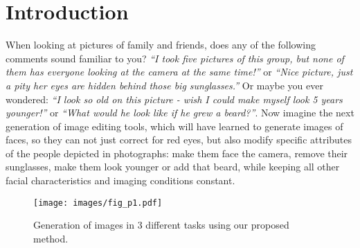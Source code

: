 \documentclass[10pt,twocolumn,letterpaper]{article}
\begin{document}
\section{Introduction}
\label{sec:intro}

When looking at pictures of family and friends, does any of the following comments sound familiar to you?
{\em``I took five pictures of this group, but none of them has everyone looking at the camera at the same time!''}
or {\em``Nice picture, just a pity her eyes are hidden behind those big sunglasses.''} Or maybe you ever wondered:
{\em``I look so old on this picture - wish I could make myself look 5 years younger!''} or {\em``What would he look like if he grew a beard?''}.
Now imagine the next generation of image editing tools, which will have learned to generate images of faces, so they can not just correct for red eyes, but also modify specific attributes of the people depicted in photographs: make them face the camera, remove their sunglasses, make them look younger or add that beard, while keeping all other facial characteristics
and imaging conditions constant.

\begin{figure}[t]
\centering
\texttt{[image: images/fig\_p1.pdf]}
\caption{Generation of images in 3 different tasks using our proposed method.}
\label{fig:page1}
\end{figure}
\end{document}
